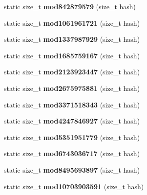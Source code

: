 \begin{DoxyCompactItemize}
\item 
static size\+\_\+t {\bfseries mod842879579} (size\+\_\+t hash)\label{structska_1_1prime__number__hash__policy_ab56114f474f578a4e54548e8ea99c696}

\item 
static size\+\_\+t {\bfseries mod1061961721} (size\+\_\+t hash)\label{structska_1_1prime__number__hash__policy_a95e55c433d285c2a210785f486eca5d7}

\item 
static size\+\_\+t {\bfseries mod1337987929} (size\+\_\+t hash)\label{structska_1_1prime__number__hash__policy_aeddd4cff87d37cf140a775464ceaa6b1}

\item 
static size\+\_\+t {\bfseries mod1685759167} (size\+\_\+t hash)\label{structska_1_1prime__number__hash__policy_a822bec93f0fa19ac6bc2fcd5baecf9bf}

\item 
static size\+\_\+t {\bfseries mod2123923447} (size\+\_\+t hash)\label{structska_1_1prime__number__hash__policy_aa8a78b03772363e48c1de9ace0d7f528}

\item 
static size\+\_\+t {\bfseries mod2675975881} (size\+\_\+t hash)\label{structska_1_1prime__number__hash__policy_aad231869eb2522a7d8a2b53f5f868ac2}

\item 
static size\+\_\+t {\bfseries mod3371518343} (size\+\_\+t hash)\label{structska_1_1prime__number__hash__policy_a2062fdc13622eb38e02c8a9e0676c24e}

\item 
static size\+\_\+t {\bfseries mod4247846927} (size\+\_\+t hash)\label{structska_1_1prime__number__hash__policy_a443cef06d6d6f9b824ed160f63c8fafb}

\item 
static size\+\_\+t {\bfseries mod5351951779} (size\+\_\+t hash)\label{structska_1_1prime__number__hash__policy_aa663c6629e5f8335112052ecc31223d8}

\item 
static size\+\_\+t {\bfseries mod6743036717} (size\+\_\+t hash)\label{structska_1_1prime__number__hash__policy_af9afe88084bf9f614e5e85190bc91393}

\item 
static size\+\_\+t {\bfseries mod8495693897} (size\+\_\+t hash)\label{structska_1_1prime__number__hash__policy_a4247ef31ca2e92948446a7a9c84ad1e4}

\item 
static size\+\_\+t {\bfseries mod10703903591} (size\+\_\+t hash)\label{structska_1_1prime__number__hash__policy_a724b676895bfca6dfe1af26c1ee3b91a}


\end{DoxyCompactItemize}
